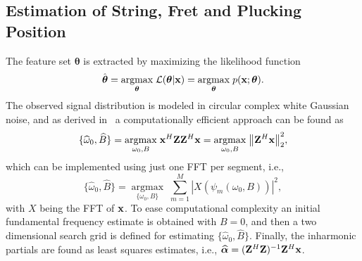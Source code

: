 \documentclass{article}
\begin{document}
\begin{sloppy}
\subsection{Estimation of String, Fret and Plucking Position}
The feature set $\boldsymbol{\theta}$ is extracted by maximizing the likelihood function %
\begin{equation}
    \hat{\boldsymbol\theta} = \underset{\text{\boldmath$\theta$}}{\operatorname{argmax}}\;{\mathcal{L}(\text{\boldmath$\theta$} | \mathbf x)} = \underset{\text{\boldmath$\theta$}}{\operatorname{argmax}}\;{p(\mathbf x ; \text{\boldmath$\theta$})}.
\end{equation}
The observed signal distribution is modeled in circular complex white Gaussian noise, and as derived in~\cite{hjerrild::icassp19} a computationally efficient approach can be found as
\begin{equation} \label{eq:ANLS}
    \{\widehat\omega_0, \widehat B \} = \underset{\omega_0,B}{\operatorname{argmax}}\;{\mathbf x^H \mathbf{Z} \mathbf{Z}^H \mathbf x} = \underset{\omega_0,B}{\operatorname{argmax}}\;{ \left\lVert\mathbf{Z}^H\mathbf x\right\rVert_2^2},
\end{equation}
which can be implemented using just one FFT per segment, i.e.,
\begin{equation}
    	\{\widehat\omega_0,\widehat B  \} = \underset{\{\omega_0, B  \}}{\operatorname{argmax}}\; \sum_{m=1}^{M} |X(\psi_m(\omega_0,B))|^2, 
\end{equation}
with $X$ being the FFT of $\mathbf x$. To ease computational complexity an initial fundamental frequency estimate is obtained with $B=0$, and then a two dimensional search grid is defined for estimating  $\{\widehat\omega_0, \widehat B \}$. %
 Finally, the inharmonic partials are found as least squares estimates, i.e.,
$  \text{\boldmath${\widehat\alpha}$} = (\mathbf{Z}^H\mathbf{Z})^{-1}\mathbf{Z}^H\mathbf x$.


\end{sloppy}
\end{document}
